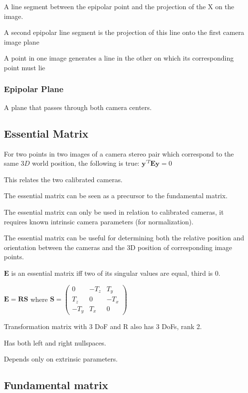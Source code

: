 A line segment between the epipolar point and the projection of the X on the image.

A second epipolar line segment is the projection of this line onto the first camera image plane

A point in one image generates a line in the other on which its corresponding point must lie

\subsubsection{Epipolar Plane}

A plane that passes through both camera centers.

\subsection{Essential Matrix}

For two points in two images of a camera stereo pair which correspond to the same $3D$ world position, the following is true: 
$\mathbf{y}^{\prime T}\mathbf{Ey}=0$

This relates the two calibrated cameras.

The essential matrix can be seen as a precursor to the fundamental matrix. 

The essential matrix can only be used in relation to calibrated cameras, it requires known intrinsic camera parameters (for normalization).

The essential matrix can be useful for determining both the relative position and orientation between the cameras and the 3D position of corresponding image points.

$\mathbf{E}$ is an essential matrix iff two of its singular values are equal, third is 0.

$\mathbf{E}=\mathbf{RS}$ where $\mathbf{S} = \left( \begin{matrix} 0 & -T_z & T_y \\ T_z & 0 & -T_x \\ -T_y & T_x & 0  \end{matrix} \right)$

Transformation matrix with 3 DoF and R also has 3 DoFs, rank 2.

Has both left and right nullspaces.

Depends only on extrinsic parameters.

\subsection{Fundamental matrix}

